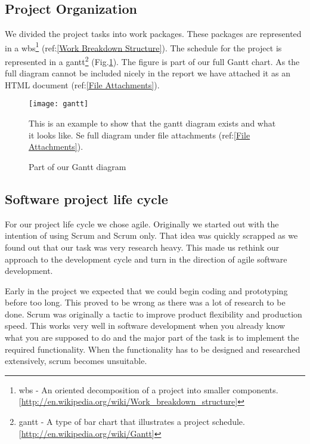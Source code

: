     \subsection{Project Organization}\label{Project Organization}
    
    We divided the project tasks into work packages. These packages are represented in a \gls{wbs}\footnote{\gls{wbs} - An oriented decomposition of a project into smaller components. [\url{http://en.wikipedia.org/wiki/Work_breakdown_structure}]} (ref:\ref{Work Breakdown Structure}). The schedule for the project is represented in a \gls{gantt}\footnote{\gls{gantt} - A type of bar chart that illustrates a project schedule. [\url{http://en.wikipedia.org/wiki/Gantt}]} (Fig.\ref{fig:gantt}). The figure is part of our full Gantt chart. As the full diagram cannot be included nicely in the report we have attached it as an HTML document (ref:\ref{File Attachments}).
     
        \begin{figure}[h]
            \centering
            \texttt{[image: gantt]}
            \caption{Part of our Gantt diagram} 
            This is an example to show that the gantt diagram exists and what it looks like. Se full diagram under file attachments (ref:\ref{File Attachments}).
            \label{fig:gantt}
        \end{figure}
    
    \subsection{Software project life cycle}\label{Software project life cycle}
    
    For our project life cycle we chose agile. Originally we started out with the intention of using Scrum and Scrum only. That idea was quickly scrapped as we found out that our task was very research heavy. This made us rethink our approach to the development cycle and turn in the direction of agile software development.
    
    Early in the project we expected that we could begin coding and prototyping before too long. This proved to be wrong as there was a lot of research to be done. Scrum was originally a tactic to improve product flexibility and production speed. This works very well in software development when you already know what you are supposed to do and the major part of the task is to implement the required functionality. When the functionality has to be designed and researched extensively, scrum becomes unsuitable. 
    
